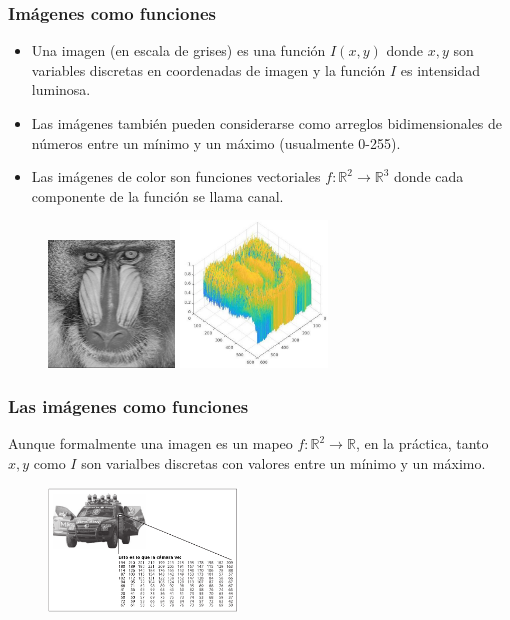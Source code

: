 \begin{frame}\frametitle{Imágenes como funciones}
  \begin{itemize}
  \item Una imagen (en escala de grises) es una función $I(x,y)$ donde $x,y$ son variables discretas en coordenadas de imagen y la función $I$ es intensidad luminosa.
    \item Las imágenes también pueden considerarse como arreglos bidimensionales de números entre un mínimo y un máximo (usualmente 0-255).
    \item Las imágenes de color son funciones vectoriales $f:\mathbb{R}^2\rightarrow \mathbb{R}^3$ donde cada componente de la función se llama canal.
  \end{itemize}
  \begin{figure}
    \centering
    \includegraphics[width=0.3\textwidth]{Figures/baboon_grayscale.jpg}
    \includegraphics[width=0.35\textwidth]{Figures/BaboonPlot.jpg}
  \end{figure}
\end{frame}

\begin{frame}\frametitle{Las imágenes como funciones}
    Aunque formalmente una imagen es un mapeo $f:\mathbb{R}^2\rightarrow \mathbb{R}$, en la práctica, tanto $x,y$ como $I$ son varialbes discretas con valores entre un mínimo y un máximo.
\begin{figure}
  \centering
  \includegraphics[width=0.45\textwidth]{Figures/ImageRepresentation.png}
\end{figure}
\end{frame}


